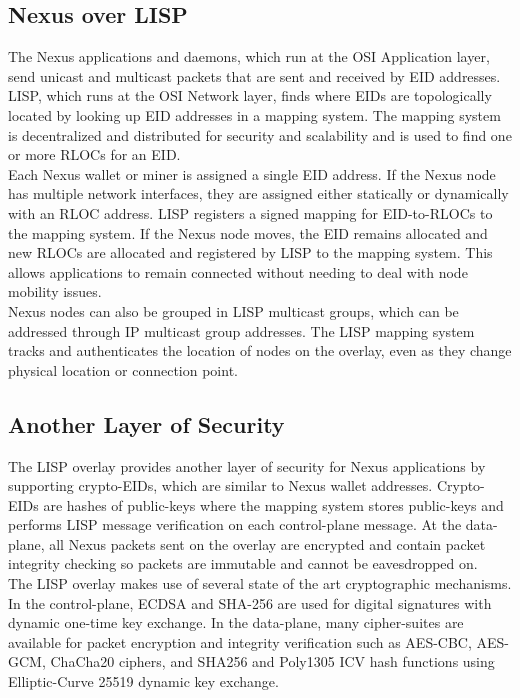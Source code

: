 \documentclass[11pt]{article}
\begin{document}
\subsection{Nexus over LISP}

\noindent The Nexus applications and daemons, which run at the OSI Application layer, send unicast and multicast packets that are sent and received by EID addresses. LISP, which runs at the OSI Network layer, finds where EIDs are topologically located by looking up EID addresses in a mapping system. 
The mapping system is decentralized and distributed for security and scalability and is used to find one or more RLOCs for an EID.\\

\noindent Each Nexus wallet or miner is assigned a single EID address. 
If the Nexus node has multiple network interfaces, they are assigned either statically or dynamically with an RLOC address. 
LISP registers a signed mapping for EID-to-RLOCs to the mapping system. 
If the Nexus node moves, the EID remains allocated and new RLOCs are allocated and registered by LISP to the mapping system.
This allows applications to remain connected without needing to deal with node mobility issues.\\

\noindent Nexus nodes can also be grouped in LISP multicast groups, which can be addressed through IP multicast group addresses. The LISP mapping system tracks and authenticates the location of nodes on the overlay, even as they change physical location or connection point.

\subsection{Another Layer of Security}


\noindent The LISP overlay provides another layer of security for Nexus applications by supporting crypto-EIDs, which are similar to Nexus wallet addresses. 
Crypto-EIDs are hashes of public-keys where the mapping system stores public-keys and performs LISP message verification on each control-plane message. 
At the data-plane, all Nexus packets sent on the overlay are encrypted and contain packet integrity checking so packets are immutable and cannot be eavesdropped on.\\

\noindent The LISP overlay makes use of several state of the art cryptographic mechanisms.
In the control-plane, ECDSA and SHA-256 are used for digital signatures with dynamic one-time key exchange. 
In the data-plane, many cipher-suites are available for packet encryption and integrity verification such as AES-CBC, AES-GCM, ChaCha20 ciphers, and SHA256 and Poly1305 ICV hash functions using Elliptic-Curve 25519 dynamic key exchange.
\end{document}
